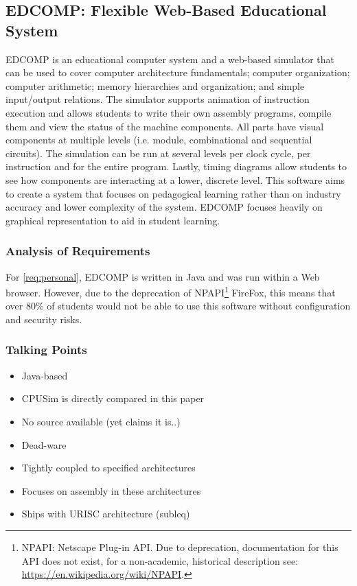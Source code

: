 \subsection{EDCOMP: Flexible Web-Based Educational System}

EDCOMP is an educational computer system and a web-based simulator that can be used to cover computer architecture fundamentals; computer organization; computer arithmetic; memory hierarchies and organization; and simple input/output relations\cite{Djordjevic2005}. The simulator supports animation of instruction execution and allows students to write their own assembly programs, compile them and view the status of the machine components. All parts have visual components at multiple levels (i.e. module, combinational and sequential circuits). The simulation can be run at several levels per clock cycle, per instruction and for the entire program. Lastly, timing diagrams allow students to see how components are interacting at a lower, discrete level. This software aims to create a system that focuses on pedagogical learning rather than on industry accuracy and lower complexity of the system. EDCOMP focuses heavily on graphical representation to aid in student learning. 


\subsubsection*{Analysis of Requirements}

For \cref{req:personal}, EDCOMP is written in Java and was run within a Web browser. However, due to the deprecation of NPAPI\footnote{NPAPI: Netscape Plug-in API. Due to deprecation, documentation for this API does not exist, for a non-academic, historical description see: \url{https://en.wikipedia.org/wiki/NPAPI}.} FireFox\cite{OracleJavaApplet2017}, this means that over 80\% of students would not be able to use this software without configuration \cite{StatCounterBrowsers2017, W3SchoolsBrowsers2017} and security risks\cite{ChromiumBlogNPAPI2013, MozillaBlogNPAPI2016, GoogleChromeHelp2015}. 


\subsubsection{Talking Points}

\begin{itemize}
    \item Java-based
    \item CPUSim is directly compared in this paper
    \item No source available (yet claims it is..)
    \item Dead-ware
    \item Tightly coupled to specified architectures
    \item Focuses on assembly in these architectures
    \item Ships with URISC architecture (subleq)
\end{itemize}

